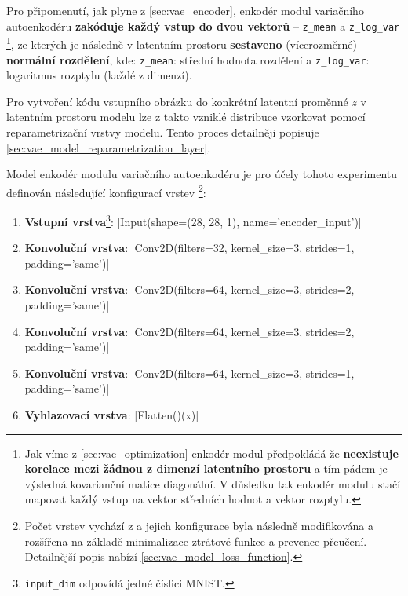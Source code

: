 Pro připomenutí, jak plyne z \autoref{sec:vae_encoder}, enkodér modul variačního autoenkodéru \textbf{zakóduje každý vstup do dvou vektorů} – \lstinline{z_mean} a \lstinline{z_log_var}
\footnote{Jak víme z \autoref{sec:vae_optimization} enkodér modul předpokládá že \textbf{neexistuje korelace mezi žádnou z dimenzí latentního prostoru} a tím pádem je výsledná kovarianční matice diagonální. V důsledku tak enkodér modulu stačí mapovat každý vstup na vektor středních hodnot a vektor rozptylu.},
ze kterých je následně v latentním prostoru \textbf{sestaveno} (vícerozměrné) \textbf{normální rozdělení}, kde:
\lstinline{z_mean}: střední hodnota rozdělení a \lstinline{z_log_var}: logaritmus rozptylu (každé z dimenzí).

Pro vytvoření kódu vstupního obrázku do konkrétní latentní proměnné $z$ v latentním prostoru modelu lze z takto vzniklé distribuce vzorkovat pomocí reparametrizační vrstvy modelu. Tento proces detailněji popisuje \autoref{sec:vae_model_reparametrization_layer}.

Model enkodér modulu variačního autoenkodéru je pro účely tohoto experimentu definován následující konfigurací vrstev \footnote{Počet vrstev vychází z \textcite{Kingma2014} a jejich konfigurace byla následně modifikována a rozšířena na základě minimalizace ztrátové funkce a prevence přeučení. Detailnější popis nabízí \autoref{sec:vae_model_loss_function}.}:
\begin{enumerate}
    \item \textbf{Vstupní vrstva}\footnote{\lstinline{input_dim} odpovídá jedné číslici MNIST.}: |Input(shape=(28, 28, 1), name='encoder_input')|
    \item \textbf{Konvoluční vrstva}: |Conv2D(filters=32, kernel_size=3, strides=1, padding='same')|
    \item \textbf{Konvoluční vrstva}: |Conv2D(filters=64, kernel_size=3, strides=2, padding='same')|
    \item \textbf{Konvoluční vrstva}: |Conv2D(filters=64, kernel_size=3, strides=2, padding='same')|
    \item \textbf{Konvoluční vrstva}: |Conv2D(filters=64, kernel_size=3, strides=1, padding='same')|
    \item \textbf{Vyhlazovací vrstva}: |Flatten()(x)|
\end{enumerate}


